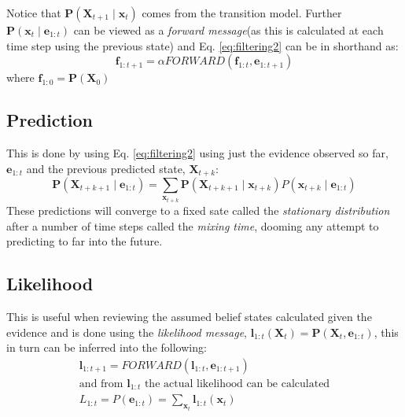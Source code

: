 \documentclass[11pt, letterpaper]{report}
\numberwithin{equation}{section}
\begin{document}
Notice that $\boldsymbol{P}(\boldsymbol{X}_{t+1} \mid \boldsymbol{x}_t)$ comes
from the transition model. Further $\boldsymbol{P}(\boldsymbol{x}_t \mid
\boldsymbol{e}_{1:t})$ can be viewed as a \emph{forward message}(as this is calculated at each
time step using the previous state) and Eq. \ref{eq:filtering2} can be in
shorthand as:
\[\boldsymbol{f}_{1:t+1} = \alpha FORWARD(\boldsymbol{f}_{1:t},\boldsymbol{e}_{1:t+1})\]
where $\boldsymbol{f}_{1:0} = \boldsymbol{P}(\boldsymbol{X}_0)$

\subsection*{Prediction}
This is done by using Eq. \ref{eq:filtering2} using just the evidence observed
so far, $\boldsymbol{e}_{1:t}$ and the previous predicted state, $\boldsymbol{X}_{t+k}$:
\begin{equation}
  \label{eq:prediction}
  \boldsymbol{P}(\boldsymbol{X}_{t+k+1} \mid \boldsymbol{e}_{1:t}) =
  \sum_{\boldsymbol{x}_{t+k}} \boldsymbol{P}(\boldsymbol{X}_{t+k+1} \mid \boldsymbol{x}_{t+k})
  P(\boldsymbol{x}_{t+k} \mid \boldsymbol{e}_{1:t})
\end{equation}
These predictions will converge to a fixed sate called the \emph{stationary
  distribution} after a number of time steps called the \emph{mixing time},
dooming any attempt to predicting to far into the future.

\subsection*{Likelihood}
This is useful when reviewing the assumed belief states calculated given the
evidence and is done using the \emph{likelihood message},
$\boldsymbol{l}_{1:t}(\boldsymbol{X}_t) = \boldsymbol{P}(\boldsymbol{X}_t,
\boldsymbol{e}_{1:t})$, this in turn can be inferred into the following:
  \begin{gather}
  \label{eq:likelihood}
  \boldsymbol{l}_{1:t+1} = FORWARD(\boldsymbol{l}_{1:t}, \boldsymbol{e}_{1:t+1})
  \nonumber\\
  \text{and from $\boldsymbol{l}_{1:t}$ the actual likelihood can be calculated} \\
  L_{1:t} = P(\boldsymbol{e}_{1:t}) = \sum_{\boldsymbol{x}_t}
  \boldsymbol{l}_{1:t}(\boldsymbol{x}_t) \nonumber
  \end{gather}
\end{document}
